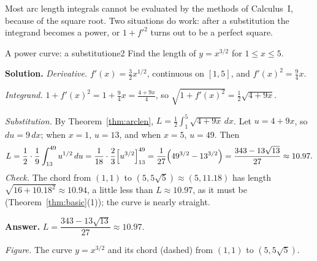 \documentclass[11pt]{article}
\begin{document}
Most arc length integrals cannot be evaluated by the methods of Calculus~I, because of the square root. Two situations do work: after a substitution the integrand becomes a power, or $1+f'^2$ turns out to be a perfect square.

\begin{exmp}{A power curve: a substitution}{e2}
Find the length of $y=x^{3/2}$ for $1\le x\le5$.

\textbf{Solution.} \emph{Derivative.} $f'(x)=\frac32x^{1/2}$, continuous on $[1,5]$, and $f'(x)^2=\frac94x$.

\emph{Integrand.} $1+f'(x)^2=1+\frac94x=\frac{4+9x}4$, so $\sqrt{1+f'(x)^2}=\frac12\sqrt{4+9x}$.

\emph{Substitution.} By Theorem~\ref{thm:arclen}, $L=\frac12\int_1^5\sqrt{4+9x}\,dx$. Let $u=4+9x$, so $du=9\,dx$; when $x=1$, $u=13$, and when $x=5$, $u=49$. Then
\[
L=\frac12\cdot\frac19\int_{13}^{49}u^{1/2}\,du=\frac1{18}\cdot\frac23\Bigl[u^{3/2}\Bigr]_{13}^{49}=\frac1{27}\Bigl(49^{3/2}-13^{3/2}\Bigr)=\frac{343-13\sqrt{13}}{27}\approx10.97 .
\]
\emph{Check.} The chord from $(1,1)$ to $(5,5\sqrt5)\approx(5,11.18)$ has length $\sqrt{16+10.18^2}\approx10.94$, a little less than $L\approx10.97$, as it must be (Theorem~\ref{thm:basic}(1)); the curve is nearly straight.

\textbf{Answer.} $L=\dfrac{343-13\sqrt{13}}{27}\approx10.97$.
\begin{center}
\par\small\emph{Figure.} The curve $y=x^{3/2}$ and its chord (dashed) from $(1,1)$ to $(5,5\sqrt5)$.
\end{center}
\end{exmp}
\end{document}
